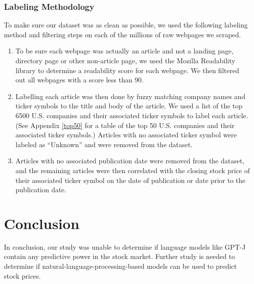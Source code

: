 \documentclass[conference]{IEEEtran}
\begin{document}
\subsubsection{Labeling Methodology}
To make sure our dataset was as clean as possible, we used the following labeling method and filtering steps on each of the millions of raw webpages we scraped.
\begin{enumerate}
    \item To be sure each webpage was actually an article and not a landing page, directory page or other non-article page, we used the Mozilla Readability library to determine a readability score for each webpage. We then filtered out all webpages with a score less than 90.
    \item Labelling each article was then done by fuzzy matching company names and ticker symbols to the title and body of the article. We used a list of the top 6500 U.S. companies and their associated ticker symbols to label each article. (See Appendix \ref{top50} for a table of the top 50 U.S. companies and their associated ticker symbols.) Articles with no associated ticker symbol were labeled as ``Unknown'' and were removed from the dataset.
    \item Articles with no associated publication date were removed from the dataset, and the remaining articles were then correlated with the closing stock price of their associated ticker symbol on the date of publication or date prior to the publication date.
\end{enumerate}
\section{Conclusion}
In conclusion, our study was unable to determine if language models like GPT-J contain any predictive power in the stock market. Further study is needed to determine if natural-language-processing-based models can be used to predict stock prices.
\end{document}
